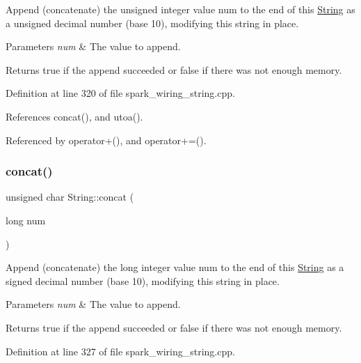 Append (concatenate) the unsigned integer value num to the end of this \hyperlink{class_string}{String} as a unsigned decimal number (base 10), modifying this string in place. 


\begin{DoxyParams}{Parameters}
{\em num} & The value to append.\\
\hline
\end{DoxyParams}
\begin{DoxyReturn}{Returns}
true if the append succeeded or false if there was not enough memory. 
\end{DoxyReturn}


Definition at line 320 of file spark\+\_\+wiring\+\_\+string.\+cpp.



References concat(), and utoa().



Referenced by operator+(), and operator+=().

\mbox{\label{class_string_a92a456f8679a19d2221ec43841238ead}} 
\subsubsection{\texorpdfstring{concat()}{concat()}\hspace{0.1cm}{\footnotesize\ttfamily [8/12]}}
{\footnotesize\ttfamily unsigned char String\+::concat (\begin{DoxyParamCaption}\item[{long}]{num }\end{DoxyParamCaption})}



Append (concatenate) the long integer value num to the end of this \hyperlink{class_string}{String} as a signed decimal number (base 10), modifying this string in place. 


\begin{DoxyParams}{Parameters}
{\em num} & The value to append.\\
\hline
\end{DoxyParams}
\begin{DoxyReturn}{Returns}
true if the append succeeded or false if there was not enough memory. 
\end{DoxyReturn}


Definition at line 327 of file spark\+\_\+wiring\+\_\+string.\+cpp.



